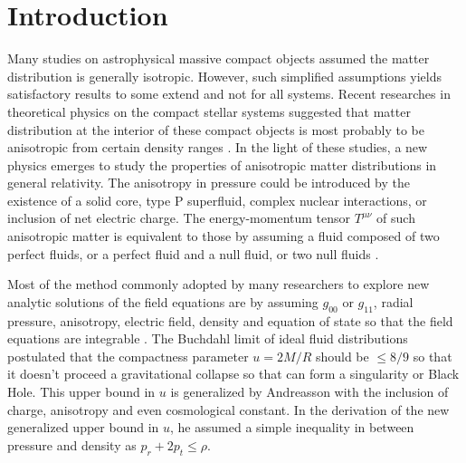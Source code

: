 \documentclass[preprintnumbers,amsmath,amssymb,floatfix,9pt,prd,twocolumn,
superscriptaddress,nofootinbib]{revtex4}
\begin{document}
\section{Introduction}

Many studies on astrophysical massive compact objects assumed the matter distribution is generally isotropic. However, such simplified assumptions yields satisfactory results to some extend and not for all systems. Recent researches in theoretical physics on the compact stellar systems suggested that matter distribution at the interior of these compact objects is most probably to be anisotropic from certain density ranges \cite{rud,can}. In the light of these studies, a new physics emerges to study the properties of anisotropic matter distributions in general relativity. The anisotropy in pressure could be introduced by the existence of a solid core, type P superfluid, complex nuclear interactions, or inclusion of net electric charge. The energy-momentum tensor $T^{\mu \nu}$ of such anisotropic matter is equivalent to those by assuming a fluid composed of two perfect fluids, or a perfect fluid and a null fluid, or two null fluids \cite{let1,let2,let3,bay}. \par
Most of the method commonly adopted by many researchers to explore new analytic solutions of the field equations are by assuming  $g_{00}$ or $g_{11}$, radial pressure, anisotropy, electric field, density and equation of state so that the field equations are integrable \cite{dev1,dev2,esc,mah1,mah2,ntn1,ntn2,ntn3,ntn4,maur1,maur2}. The Buchdahl limit of ideal fluid distributions postulated that the compactness parameter $u=2M/R$ should be $\le 8/9$  so that it doesn't proceed a gravitational collapse so that can form a singularity or Black Hole. This upper bound in $u$ is generalized by Andreasson \cite{and1,and2} with the inclusion of charge, anisotropy and even cosmological constant. In the derivation of the new generalized upper bound in $u$, he assumed a simple inequality in between pressure and density as $p_r+2p_t\le \rho$.\par
\end{document}
